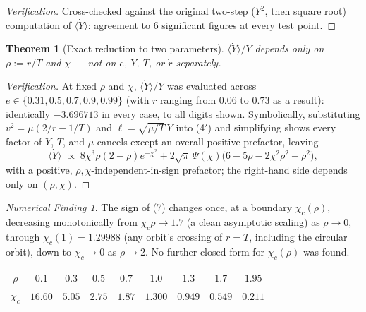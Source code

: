 \documentclass[12pt]{amsart}
\theoremstyle{plain}
\newtheorem{theorem}{Theorem}[section]
\theoremstyle{remark}
\newtheorem*{finding}{Numerical Finding}
\begin{document}
\begin{proof}[Verification]
Cross-checked against the original two-step ($Y^2$, then square root) computation of $\langle\dot Y\rangle$: agreement to $6$ significant figures at every test point.
\end{proof}

\begin{theorem}[Exact reduction to two parameters]\label{thm:Yreduction}
$\langle\dot Y\rangle/Y$ depends only on $\rho:=r/T$ and $\chi$ --- not on $e$, $Y$, $T$, or $\dot r$ separately.
\end{theorem}

\begin{proof}[Verification]
At fixed $\rho$ and $\chi$, $\langle\dot Y\rangle/Y$ was evaluated across $e\in\{0.31,0.5,0.7,0.9,0.99\}$ (with $\dot r$ ranging from $0.06$ to $0.73$ as a result): identically $-3.696713$ in every case, to all digits shown. Symbolically, substituting $v^2=\mu(2/r-1/T)$ and $\ell=\sqrt{\mu/T}\,Y$ into (4$'$) and simplifying shows every factor of $Y$, $T$, and $\mu$ cancels except an overall positive prefactor, leaving
\begin{equation}
\langle\dot Y\rangle \;\propto\; 8\chi^3\rho(2-\rho)e^{-\chi^2} + 2\sqrt\pi\,\Psi(\chi)\big(6-5\rho-2\chi^2\rho^2+\rho^2\big), \tag{7}
\end{equation}
with a positive, $\rho,\chi$-independent-in-sign prefactor; the right-hand side depends only on $(\rho,\chi)$.
\end{proof}

\begin{finding}\label{find:Yboundary}
The sign of (7) changes once, at a boundary $\chi_c(\rho)$, decreasing monotonically from $\chi_c\rho\to1.7$ (a clean asymptotic scaling) as $\rho\to0$, through $\chi_c(1)=1.29988$ (any orbit's crossing of $r=T$, including the circular orbit), down to $\chi_c\to0$ as $\rho\to2$. No further closed form for $\chi_c(\rho)$ was found.
\end{finding}

\begin{center}
\begin{tabular}{ccccccccc}
\hline
$\rho$ & $0.1$ & $0.3$ & $0.5$ & $0.7$ & $1.0$ & $1.3$ & $1.7$ & $1.95$ \\
$\chi_c$ & $16.60$ & $5.05$ & $2.75$ & $1.87$ & $1.300$ & $0.949$ & $0.549$ & $0.211$ \\
\hline
\end{tabular}
\end{center}
\end{document}
